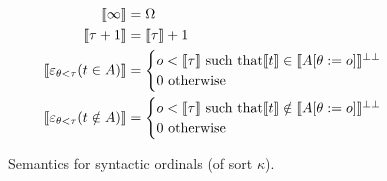 \begin{figure}
  \begin{align*}
    \llbracket \infty \rrbracket &= \Omega\\
    \llbracket \tau+1 \rrbracket &= \llbracket \tau \rrbracket + 1\\
    \llbracket \varepsilon_{\theta<\tau}(t \in A) \rrbracket
      &= \begin{cases}
            o < \llbracket \tau \rrbracket \text{ such that}
              \llbracket t \rrbracket \in \llbracket A[\theta := o]
              \rrbracket^{\bot\bot}\\
            0 \text{ otherwise}
         \end{cases}\\
    \llbracket \varepsilon_{\theta<\tau}(t \notin A) \rrbracket
      &= \begin{cases}
            o < \llbracket \tau \rrbracket \text{ such that}
              \llbracket t \rrbracket \notin \llbracket A[\theta := o]
              \rrbracket^{\bot\bot}\\
            0 \text{ otherwise}
         \end{cases}
  \end{align*}
  \caption{Semantics for syntactic ordinals (of sort $\kappa$).}
  \label{semkappa}
\end{figure}

